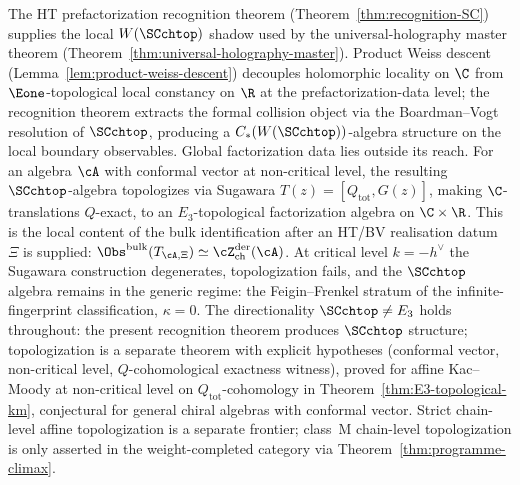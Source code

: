 \begin{remark}
\label{rem:locality-holography-anchor}%
%
The HT prefactorization recognition theorem
(Theorem~\ref{thm:recognition-SC}) supplies the local
$W(\SCchtop)$ shadow used by the universal-holography master theorem
(Theorem~\ref{thm:universal-holography-master}). Product Weiss
descent (Lemma~\ref{lem:product-weiss-descent}) decouples
holomorphic locality on $\C$ from $\Eone$-topological local
constancy on $\R$ at the prefactorization-data level; the
recognition theorem extracts the formal collision object via the
Boardman--Vogt resolution of $\SCchtop$, producing a
$C_*(W(\SCchtop))$-algebra structure on the local boundary
observables. Global factorization data lies outside its reach.
For an algebra $\cA$ with conformal vector at non-critical level,
the resulting $\SCchtop$-algebra topologizes via Sugawara
$T(z) = [Q_{\mathrm{tot}}, G(z)]$, making $\C$-translations
$Q$-exact, to an $E_3$-topological factorization algebra on
$\C \times \R$. This is the local content of the bulk
identification after an HT/BV realisation datum $\Xi$ is supplied:
$\Obs^{\mathrm{bulk}}(T_{\cA,\Xi}) \simeq
\cZ^{\mathrm{der}}_{\mathrm{ch}}(\cA)$.
At critical level $k = -h^\vee$ the Sugawara construction
degenerates, topologization fails, and the $\SCchtop$ algebra
remains in the generic regime: the Feigin--Frenkel stratum of the
infinite-fingerprint classification, $\kappa = 0$.
The directionality $\SCchtop \neq E_3$ holds throughout: the
present recognition theorem produces $\SCchtop$ structure;
topologization is a separate theorem with explicit hypotheses
(conformal vector, non-critical level, \(Q\)-cohomological exactness
witness), proved for affine Kac--Moody at non-critical level on
\(Q_{\mathrm{tot}}\)-cohomology in
Theorem~\ref{thm:E3-topological-km}, conjectural for general
chiral algebras with conformal vector. Strict chain-level affine
topologization is a separate frontier; class~M chain-level
topologization is only asserted in the weight-completed category via
Theorem~\ref{thm:programme-climax}.
\end{remark}
